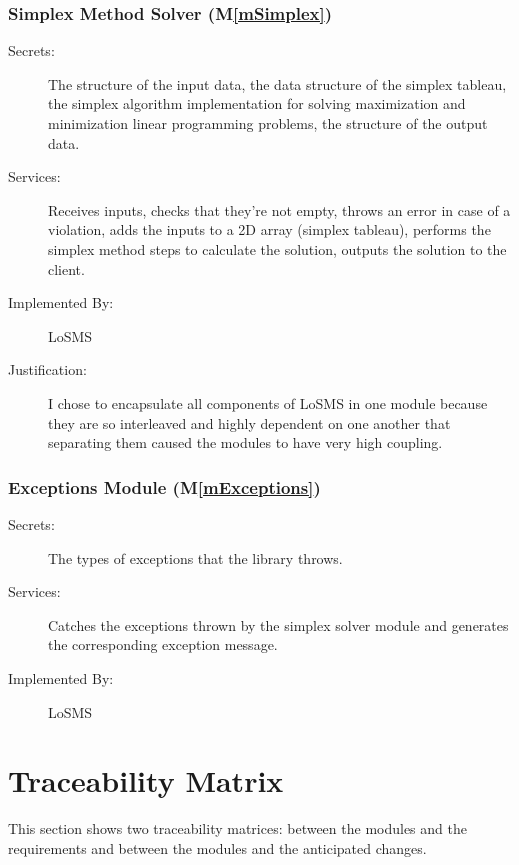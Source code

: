 \documentclass[12pt, titlepage]{article}
\newcommand{\mref}[1]{M\ref{#1}}
\newcommand{\famname}{LoSMS} %
\begin{document}
\subsubsection{Simplex Method Solver (\mref{mSimplex})}

\begin{description}
	\item[Secrets:]The structure of the input data, the data structure of the 
	simplex tableau, the simplex algorithm implementation for solving 
	maximization and minimization linear programming problems, the structure of 
	the output data.
	\item[Services:]Receives inputs, checks that they're not empty, throws an 
	error in case of a violation, adds the inputs to a 2D array (simplex 
	tableau), performs the simplex method steps to calculate the solution, 
	outputs the solution to the client.
	\item[Implemented By:] \famname{}
	\item[Justification:] I chose to encapsulate all components of \famname{} 
	in one module because they are so interleaved and highly dependent on one 
	another that separating them caused the modules to have very high coupling.
\end{description}

\subsubsection{Exceptions Module (\mref{mExceptions})}

\begin{description}
	\item[Secrets:]The types of exceptions that the library throws.
	\item[Services:]Catches the exceptions thrown by the simplex solver module 
	and generates the corresponding exception message.
	\item[Implemented By:] \famname{}
\end{description}

\section{Traceability Matrix} \label{SecTM}

This section shows two traceability matrices: between the modules and the
requirements and between the modules and the anticipated changes.
\end{document}
